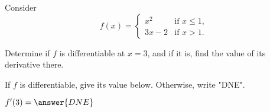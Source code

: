 \documentclass{ximera}
\author{Steven Gubkin}
\begin{document}
\begin{exercise}



Consider 
\[
f(x) = \begin{cases} 
	x^2 &\text{if $x \leq 1$,}\\
	 3x-2 &\text{if  $x > 1$.}
\end{cases}
\]


Determine if $f$ is differentiable at $x=3$, and if it is, find the value of its derivative there.

\begin{prompt}
	If $f$ is differentiable, give its value below.  Otherwise, write "DNE".
	
	$f'(3) = \answer{DNE}$
\end{prompt}

\end{exercise}
\end{document}
